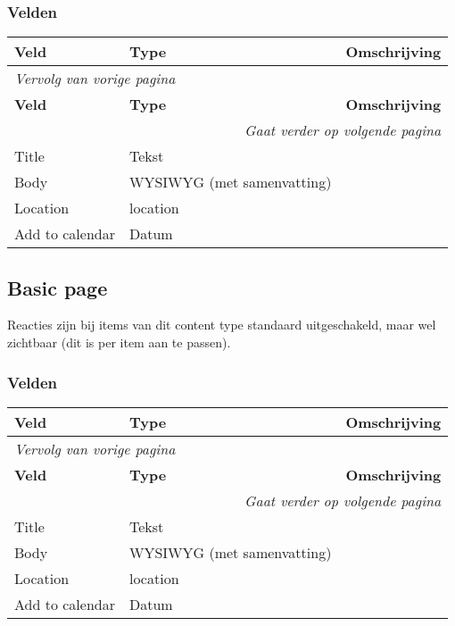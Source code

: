 \subsubsection{Velden}
  \begin{longtable}{| p{3.75cm}|p{3.75cm}|p{7.50cm}|}
  \hline
  \rowcolor{tableheader}
  \textbf{Veld} & \textbf{Type} & \textbf{Omschrijving}  \tabularnewline
  \hline
\endfirsthead
\multicolumn{3}{l}{\textit{Vervolg van vorige pagina}} \\
\hline
\rowcolor{tableheader}
  \textbf{Veld} & \textbf{Type} & \textbf{Omschrijving}  \tabularnewline
  \hline
\hline
\endhead
\multicolumn{3}{r}{\textit{Gaat verder op volgende pagina}} \\
\endfoot
\hline
\endlastfoot
  \raggedright{Title} & \raggedright{Tekst} & \raggedright{}  \tabularnewline
  \hline
  \raggedright{Body} & \raggedright{WYSIWYG (met samenvatting)} & \raggedright{}  \tabularnewline
  \hline
  \raggedright{Location} & \raggedright{location} & \raggedright{}  \tabularnewline
  \hline
  \raggedright{Add to calendar} & \raggedright{Datum} & \raggedright{}  \tabularnewline
  \hline
  \end{longtable}

\subsection{Basic page}
\label{sec:content-basic page}
Reacties zijn bij items van dit content type standaard uitgeschakeld, maar wel zichtbaar (dit is per item aan te passen).

\subsubsection{Velden}
  \begin{longtable}{| p{3.75cm}|p{3.75cm}|p{7.50cm}|}
  \hline
  \rowcolor{tableheader}
  \textbf{Veld} & \textbf{Type} & \textbf{Omschrijving}  \tabularnewline
  \hline
\endfirsthead
\multicolumn{3}{l}{\textit{Vervolg van vorige pagina}} \\
\hline
\rowcolor{tableheader}
  \textbf{Veld} & \textbf{Type} & \textbf{Omschrijving}  \tabularnewline
  \hline
\hline
\endhead
\multicolumn{3}{r}{\textit{Gaat verder op volgende pagina}} \\
\endfoot
\hline
\endlastfoot
  \raggedright{Title} & \raggedright{Tekst} & \raggedright{}  \tabularnewline
  \hline
  \raggedright{Body} & \raggedright{WYSIWYG (met samenvatting)} & \raggedright{}  \tabularnewline
  \hline
  \raggedright{Location} & \raggedright{location} & \raggedright{}  \tabularnewline
  \hline
  \raggedright{Add to calendar} & \raggedright{Datum} & \raggedright{}  \tabularnewline
  \hline
  \end{longtable}

